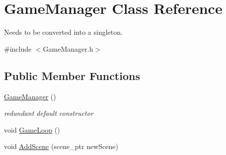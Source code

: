 \hypertarget{class_game_manager}{}\section{Game\+Manager Class Reference}
\label{class_game_manager}


Needs to be converted into a singleton.  




{\ttfamily \#include $<$Game\+Manager.\+h$>$}

\subsection*{Public Member Functions}
\begin{DoxyCompactItemize}
\item 
\mbox{\label{class_game_manager_aa0e2424dc1a39d380e5b6605b179bf05}} 
\hyperlink{class_game_manager_aa0e2424dc1a39d380e5b6605b179bf05}{Game\+Manager} ()
\begin{DoxyCompactList}\small\item\em redundant default constructor \end{DoxyCompactList}\item 
void \hyperlink{class_game_manager_a5baa570812ae717f809fe0dc48bde22e}{Game\+Loop} ()
\item 
void \hyperlink{class_game_manager_a65e593032333cee8723ad08ebfe897fc}{Add\+Scene} (scene\+\_\+ptr new\+Scene)
\end{DoxyCompactItemize}
